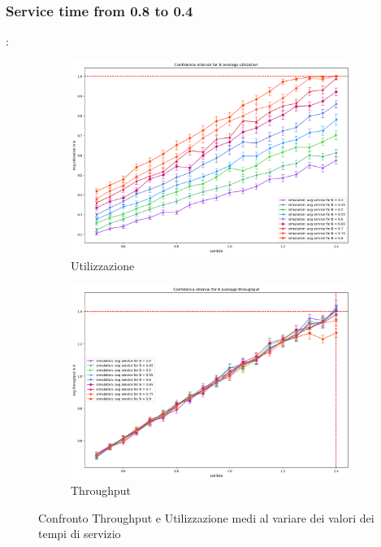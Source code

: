 \subsubsection{Service time from 0.8 to 0.4}
\begin{frame}{\subsecname: \subsubsecname}
    \begin{figure}
        \centering
        \begin{subfigure}{0.49\linewidth}
            \centering
            \includegraphics[width=\linewidth]{figs/results/obj4/obj4-utilization-service-time.png}
            \caption{Utilizzazione}
            \label{fig:obj4_utilization_service-time}
        \end{subfigure}
        \hfill
        \begin{subfigure}{0.49\linewidth}
            \centering
            \includegraphics[width=\linewidth]{figs/results/obj4/obj4-throughput-service-time.png}
            \caption{Throughput}
            \label{fig:obj4_throughput_service-time}
        \end{subfigure}
        \caption{Confronto Throughput e Utilizzazione medi al variare dei valori dei tempi di servizio}
        \label{fig:obj4-service-time-comparison}
    \end{figure}
\end{frame}

